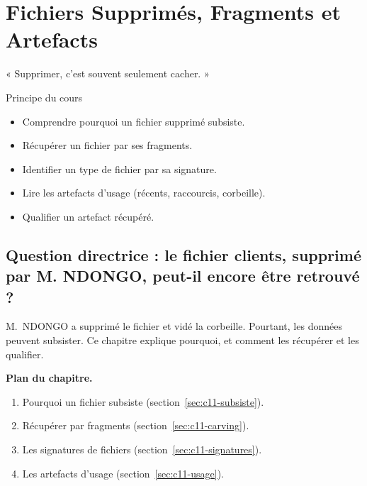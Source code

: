 
\chapter{Fichiers Supprimés, Fragments et Artefacts}
\label{chap:artefacts}

\epigraph{%
    « Supprimer, c'est souvent seulement cacher. »%
}{Principe du cours}


\begin{boxobjectifs}
\begin{itemize}
    \item Comprendre pourquoi un fichier supprimé subsiste.
    \item Récupérer un fichier par ses fragments.
    \item Identifier un type de fichier par sa signature.
    \item Lire les artefacts d'usage (récents, raccourcis, corbeille).
    \item Qualifier un artefact récupéré.
\end{itemize}
\end{boxobjectifs}

\bigskip

\section*{Question directrice : le fichier clients, supprimé par M. NDONGO, peut-il encore être retrouvé ?}

M.~NDONGO a supprimé le fichier et vidé la corbeille. Pourtant, les données
peuvent subsister. Ce chapitre explique pourquoi, et comment les récupérer et
les qualifier.

\medskip
\textbf{Plan du chapitre.}
\begin{enumerate}
    \item Pourquoi un fichier subsiste (section~\ref{sec:c11-subsiste}).
    \item Récupérer par fragments (section~\ref{sec:c11-carving}).
    \item Les signatures de fichiers (section~\ref{sec:c11-signatures}).
    \item Les artefacts d'usage (section~\ref{sec:c11-usage}).
\end{enumerate}


